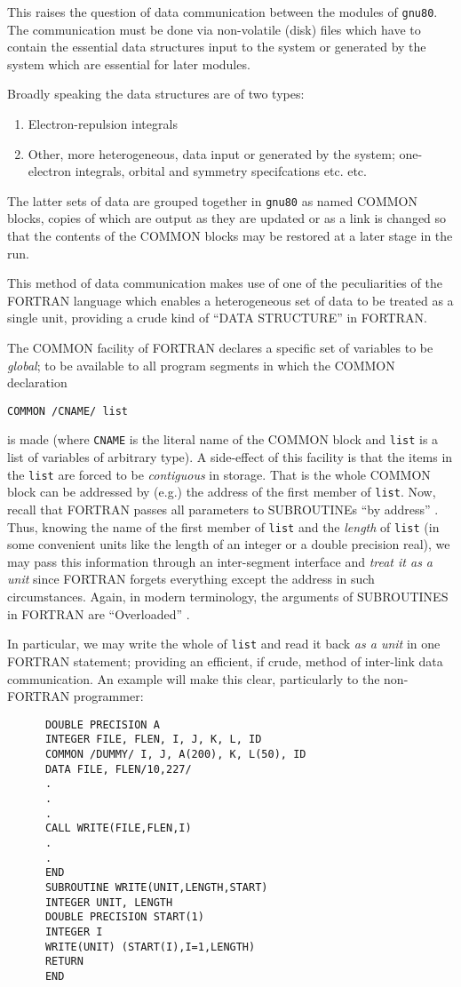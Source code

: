 This raises the question of data communication between the modules of
{\tt gnu80}. The communication must be done via non-volatile (disk) files
which have to contain the essential data structures input to the system
or generated by the system which are essential for later modules.

Broadly speaking the data structures are of two types:
\begin{enumerate}
\item Electron-repulsion integrals
\item Other, more heterogeneous, data input or generated by the system;
one-electron integrals, orbital and symmetry specifcations etc. etc.
\end{enumerate}
The latter sets of data are grouped together in {\tt gnu80} as named
COMMON blocks, copies of which are output as they are updated or
as a link is changed so that the contents of the COMMON blocks
may be restored at a later stage in the run.

This method of data communication makes use of one of the
peculiarities of the 
FORTRAN language which enables a heterogeneous set of data to be treated as a 
single unit, providing a crude kind of ``DATA STRUCTURE'' in
FORTRAN.

The COMMON facility of FORTRAN declares a specific set of variables
to be {\em global}; to be available to all program segments in which the
COMMON declaration
\begin{center}
{\tt COMMON /CNAME/ list}
\end{center}
is made (where {\tt CNAME} is the literal name of the COMMON block and
{\tt list} is a list of variables of arbitrary type).
A side-effect of this facility is that the items in the {\tt list}
are forced to be {\em contiguous} in storage. That is the whole
COMMON block can be addressed by (e.g.) the address of the first
member of {\tt list}. Now, recall that FORTRAN passes all parameters
to SUBROUTINEs ``by address'' . Thus, knowing the
name of the first member of {\tt list} and the {\em length} of {\tt list}
(in some convenient units like the length of an integer or a double
precision real), we may pass this information through an inter-segment
interface and {\em treat it as a unit} since FORTRAN forgets
everything except the address in such circumstances. Again, in modern
terminology, the arguments of SUBROUTINES in FORTRAN are
``Overloaded'' .

In particular, we may write the whole of {\tt list} and read it back
{\em as a unit} in one FORTRAN statement; providing an efficient,
if crude, method
of inter-link data communication.
An example will make this clear, particularly to the non-FORTRAN
programmer:
\newpage
\begin{verbatim}
      DOUBLE PRECISION A
      INTEGER FILE, FLEN, I, J, K, L, ID
      COMMON /DUMMY/ I, J, A(200), K, L(50), ID
      DATA FILE, FLEN/10,227/
      .
      .
      .
      CALL WRITE(FILE,FLEN,I)
      .
      .
      END
      SUBROUTINE WRITE(UNIT,LENGTH,START)
      INTEGER UNIT, LENGTH
      DOUBLE PRECISION START(1)
      INTEGER I
      WRITE(UNIT) (START(I),I=1,LENGTH)
      RETURN
      END
\end{verbatim}

